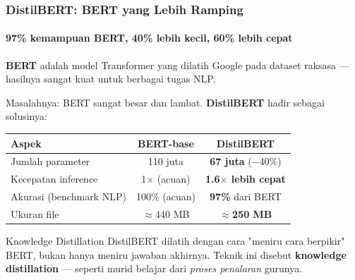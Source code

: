 \documentclass[t,aspectratio=169,xcolor=dvipsnames]{beamer}
\begin{document}
\begin{frame}
    \frametitle{DistilBERT: BERT yang Lebih Ramping}
    \framesubtitle{97\% kemampuan BERT, 40\% lebih kecil, 60\% lebih cepat}
    \small
    \textbf{BERT} adalah model Transformer yang dilatih Google pada dataset raksasa — hasilnya sangat kuat untuk berbagai tugas NLP.

    \vspace{0.3em}
    Masalahnya: BERT sangat besar dan lambat. \textbf{DistilBERT} hadir sebagai solusinya:

    \vspace{0.3em}
    \begin{center}
    {\footnotesize
    \begin{tabular}{lcc}
        \toprule
        \textbf{Aspek}          & \textbf{BERT-base}          & \textbf{DistilBERT} \\
        \midrule
        Jumlah parameter        & 110 juta                    & \textbf{67 juta} ($-$40\%) \\
        Kecepatan inference     & 1$\times$ (acuan)           & \textbf{1.6$\times$ lebih cepat} \\
        Akurasi (benchmark NLP) & 100\% (acuan)               & \textbf{97\%} dari BERT \\
        Ukuran file             & $\approx$440 MB             & $\approx$\textbf{250 MB} \\
        \bottomrule
    \end{tabular}}
    \end{center}

    \vspace{0.3em}
    \begin{exampleblock}{Knowledge Distillation}
        \footnotesize
        DistilBERT dilatih dengan cara "meniru cara berpikir" BERT, bukan hanya meniru jawaban akhirnya. Teknik ini disebut \textbf{knowledge distillation} — seperti murid belajar dari \textit{proses penalaran} gurunya.
    \end{exampleblock}
\end{frame}
\end{document}
